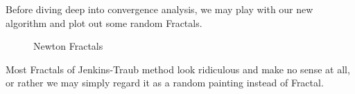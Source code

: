 \documentclass[11pt]{article}
\begin{document}
Before diving deep into convergence analysis, we may play with our new algorithm and plot out some random Fractals.
\begin{figure}[H]
	\centering
	\centering
	\caption{Newton Fractals}
\end{figure}

Most Fractals of Jenkins-Traub method look ridiculous and make no sense at all, or rather we may simply regard it as a random painting instead of Fractal.
\end{document}
